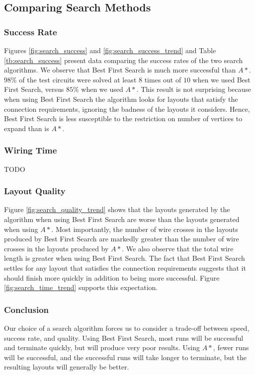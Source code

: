 \subsection{Comparing Search Methods}

\subsubsection{Success Rate}
Figures \ref{fig:search_success} and
\ref{fig:search_success_trend} and Table \ref{tb:search_success} present
data comparing the success rates of the two search algorithms.
We observe that Best First Search is much more
successful than $A*$. $98\%$ of the test circuits were solved at least $8$ times
out of $10$ when we used Best First Search, versus $85\%$ when we used $A*$.
This result is not surprising because when using Best First Search the algorithm
looks for layouts that satisfy the connection requirements, ignoring the badness
of the layouts it considers. Hence, Best First Search is less susceptible to the
restriction on number of vertices to expand than is $A*$.

\subsubsection{Wiring Time}
TODO

\subsubsection{Layout Quality}
Figure \ref{fig:search_quality_trend} shows that the layouts generated by the
algorithm when using Best First Search are worse than the layouts generated
when using $A*$. Most importantly, the
number of wire crosses in the layouts produced by Best First Search are markedly
greater than the number of wire crosses in the layouts produced by $A*$. We also
observe that the total wire length is greater when using Best First Search. The
fact that Best First Search settles for any layout that satisfies the connection
requirements suggests that it should finish more quickly in addition to being
more successful. Figure \ref{fig:search_time_trend} supports this
expectation.

\subsubsection{Conclusion}
Our choice of a search algorithm forces us to consider a trade-off between
speed, success rate, and quality.
Using Best First Search, most runs will be successful
and terminate quickly, but will produce very poor results. Using $A*$,
fewer runs will be successful, and the successful runs will take longer to
terminate, but the resulting layouts will generally be better.

